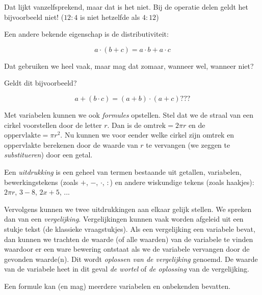 Dat lijkt vanzelfsprekend, maar dat is het niet. Bij de operatie delen
geldt het bijvoorbeeld niet! ($12:4$ is niet hetzelfde als $4:12$)

Een andere bekende eigenschap is de distributiviteit:

\begin{equation*}
a \cdot (b + c) = a \cdot b + a \cdot c
\end{equation*}

Dat gebruiken we heel vaak, maar mag dat zomaar, wanneer wel, wanneer
niet?

Geldt dit bijvoorbeeld?

\begin{equation*}
a + (b \cdot c) = (a + b) \cdot (a + c) ???
\end{equation*}




Met variabelen kunnen we ook \emph{formules} opstellen.
Stel dat we de straal van een cirkel voorstellen door de letter $r$.
Dan is de $\mathrm{omtrek}=2\pi r$ en de $\mathrm{oppervlakte}=\pi r^{2}$.
Nu kunnen we voor eender welke cirkel zijn omtrek en oppervlakte berekenen
door de waarde van $r$ te vervangen (we zeggen te \emph{substitueren})
door een getal.




Een \emph{uitdrukking} is een geheel van termen bestaande
uit getallen, variabelen, bewerkingstekens (zoals $+$, $-$, $\cdot$, $:$) en andere
wiskundige tekens (zoals haakjes): $2\pi r$, $3-8$, $2x+5$, ...

Vervolgens kunnen we twee uitdrukkingen aan elkaar gelijk
stellen. We spreken dan van een \emph{vergelijking}. Vergelijkingen
kunnen vaak worden afgeleid uit een stukje tekst (de klassieke vraagstukjes).
Als een vergelijking een variabele bevat, dan kunnen we trachten de
waarde (of alle waarden) van de variabele te vinden waardoor er een
ware bewering ontstaat als we de variabele vervangen door de gevonden
waarde(n). Dit wordt \emph{oplossen van de vergelijking} genoemd.
De waarde van de variabele heet in dit geval \emph{de wortel} of \emph{de
oplossing} van de vergelijking.

Een formule kan (en mag) meerdere variabelen en onbekenden
bevatten. 



